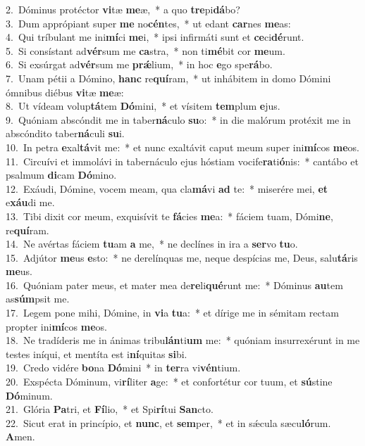 {2.~}Dóminus protéctor \textbf{vi}tæ \textbf{me}æ,~* a quo \textbf{tre}pi\textbf{dá}bo?\\
{3.~}Dum apprópiant super \textbf{me} no\textbf{cén}tes,~* ut edant \textbf{car}nes \textbf{me}as:\\
{4.~}Qui tríbulant me ini\textbf{mí}ci \textbf{me}i,~* ipsi infirmáti sunt et \textbf{ce}ci\textbf{dé}runt.\\
{5.~}Si consístant ad\textbf{vér}sum me \textbf{ca}stra,~* non ti\textbf{mé}bit cor \textbf{me}um.\\
{6.~}Si exsúrgat ad\textbf{vér}sum me \textbf{prǽ}lium,~* in hoc \textbf{e}go spe\textbf{rá}bo.\\
{7.~}Unam pétii a Dómino, \textbf{hanc} re\textbf{quí}ram,~* ut inhábitem in domo Dómini ómnibus diébus \textbf{vi}tæ \textbf{me}æ:\\
{8.~}Ut vídeam volup\textbf{tá}tem \textbf{Dó}mini,~* et vísitem \textbf{tem}plum \textbf{e}jus.\\
{9.~}Quóniam abscóndit me in taber\textbf{ná}culo \textbf{su}o:~* in die malórum protéxit me in abscóndito taber\textbf{ná}culi \textbf{su}i.\\
{10.~}In petra \textbf{e}xal\textbf{tá}vit me:~* et nunc exaltávit caput meum super ini\textbf{mí}cos \textbf{me}os.\\
{11.~}Circuívi et immolávi in tabernáculo ejus hóstiam vocife\textbf{ra}ti\textbf{ó}nis:~* cantábo et psalmum \textbf{di}cam \textbf{Dó}mino.\\
{12.~}Exáudi, Dómine, vocem meam, qua cla\textbf{má}vi \textbf{ad} te:~* miserére mei, \textbf{et} e\textbf{xáu}di me.\\
{13.~}Tibi dixit cor meum, exquisívit te \textbf{fá}cies \textbf{me}a:~* fáciem tuam, Dómi\textbf{ne}, re\textbf{quí}ram.\\
{14.~}Ne avértas fáciem \textbf{tu}am \textbf{a} me,~* ne declínes in ira a \textbf{ser}vo \textbf{tu}o.\\
{15.~}Adjútor \textbf{me}us \textbf{e}sto:~* ne derelínquas me, neque despícias me, Deus, salu\textbf{tá}ris \textbf{me}us.\\
{16.~}Quóniam pater meus, et mater mea de\textbf{re}li\textbf{qué}runt me:~* Dóminus \textbf{au}tem as\textbf{súm}psit me.\\
{17.~}Legem pone mihi, Dómine, in \textbf{vi}a \textbf{tu}a:~* et dírige me in sémitam rectam propter ini\textbf{mí}cos \textbf{me}os.\\
{18.~}Ne tradíderis me in ánimas tribu\textbf{lán}ti\textbf{um} me:~* quóniam insurrexérunt in me testes iníqui, et mentíta est i\textbf{ní}quitas \textbf{si}bi.\\
{19.~}Credo vidére \textbf{bo}na \textbf{Dó}mini~* in \textbf{ter}ra vi\textbf{vén}tium.\\
{20.~}Exspécta Dóminum, vi\textbf{rí}liter \textbf{a}ge:~* et confortétur cor tuum, et \textbf{sú}stine \textbf{Dó}minum.\\
{21.~}Glória \textbf{Pa}tri, et \textbf{Fí}lio,~* et Spi\textbf{rí}tui \textbf{San}cto.\\
{22.~}Sicut erat in princípio, et \textbf{nunc}, et \textbf{sem}per,~* et in sǽcula sæcu\textbf{ló}rum. \textbf{A}men.\\
